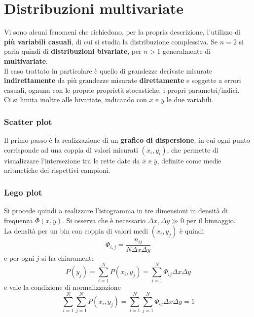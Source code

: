 \documentclass[10pt, oneside]{book}
\begin{document}
\chapter{Distribuzioni multivariate}
Vi sono alcuni fenomeni che richiedono, per la propria descrizione, l'utilizzo di \textbf{più variabili casuali}, di cui si studia la distribuzione complessiva. Se $n = 2$ si parla quindi di \textbf{distribuzioni bivariate}, per $n > 1$ generalmente di \textbf{multivariate}.\\
Il caso trattato in particolare è quello di grandezze derivate misurate \textbf{indirettamente} da più grandezze misurate \textbf{direttamente} e soggette a errori casuali, ognuna con le proprie proprietà stocastiche, i propri parametri/indici.\\
Ci si limita inoltre alle bivariate, indicando con $x$ e $y$ le due variabili.

\subsection{Scatter plot}
Il primo passo è la realizzazione di un \textbf{grafico di dispersione}, in cui ogni punto corrisponde ad una coppia di valori misurati $(x_i, y_i)$, che permette di visualizzare l'intersezione tra le rette date da $\overline{x}$ e $\overline{y}$, definite come medie aritmetiche dei rispettivi campioni.
\subsection{Lego plot}
Si procede quindi a realizzare l'istogramma in tre dimensioni in densità di frequenza $\Phi(x,y)$. Si osserva che è necessario $\Delta x, \Delta y \gg 0$ per il binnaggio.\\
La densità per un bin con coppia di valori medi $(x_i, y_j)$ è quindi
\[\Phi_{i,j} = \frac{n_{ij}}{N \Delta x \Delta y}\]
e per ogni $j$ si ha chiaramente
\[P(y_j) = \sum\limits_{i=1}^N P(x_i, y_j) = \sum\limits_{i=1}^N \Phi_{ij} \Delta x \Delta y\]
e vale la condizione di normalizzazione
\[\sum\limits_{i=1}^N \sum\limits_{j=1}^N P(x_i, y_j) = \sum\limits_{i=1}^N \sum\limits_{j=1}^N \Phi_{ij} \Delta x \Delta y = 1\]
\end{document}
